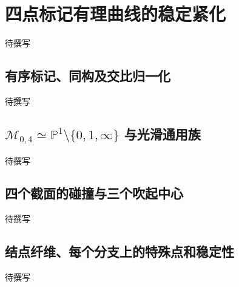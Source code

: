 
% 
% 
% 
% 
% 
% 
% 
% 
% 
% 

\section{四点标记有理曲线的稳定紧化}
\label{g5:sec:3406}

待撰写

\subsection{有序标记、同构及交比归一化}
\label{g5:subsec:3406:01}
待撰写

\subsection{\texorpdfstring{\(\mathcal M_{0,4}\simeq\mathbb P^1\setminus\{0,1,\infty\}\) 与光滑通用族}{M\_\{0,4\}≃P¹∖\{0,1,∞\} 与光滑通用族}}
\label{g5:subsec:3406:02}
待撰写

\subsection{四个截面的碰撞与三个吹起中心}
\label{g5:subsec:3406:03}
待撰写

\subsection{结点纤维、每个分支上的特殊点和稳定性}
\label{g5:subsec:3406:04}
待撰写

